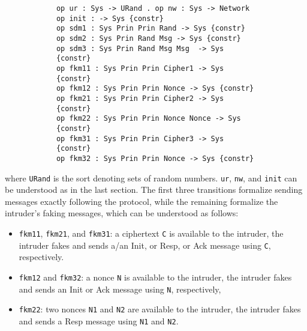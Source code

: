 \documentclass[10pt, conference, compsocconf]{IEEEtran}
\begin{document}
	\begin{small}
		\begin{verbatim}
			op ur : Sys -> URand . op nw : Sys -> Network
			op init : -> Sys {constr}
			op sdm1 : Sys Prin Prin Rand -> Sys {constr}
			op sdm2 : Sys Prin Rand Msg -> Sys {constr}
			op sdm3 : Sys Prin Rand Msg Msg  -> Sys 
			{constr}
			op fkm11 : Sys Prin Prin Cipher1 -> Sys 
			{constr}
			op fkm12 : Sys Prin Prin Nonce -> Sys {constr}
			op fkm21 : Sys Prin Prin Cipher2 -> Sys 
			{constr}
			op fkm22 : Sys Prin Prin Nonce Nonce -> Sys 
			{constr}
			op fkm31 : Sys Prin Prin Cipher3 -> Sys 
			{constr}
			op fkm32 : Sys Prin Prin Nonce -> Sys {constr}
		\end{verbatim}
	\end{small}
	
	
	\noindent
	where \verb!URand! is the sort denoting sets of random numbers.
	\verb!ur!, \verb!nw!, and \verb!init! can be understood as in the last section.
	The first three transitions formalize sending messages exactly following the protocol, while the remaining formalize the intruder's faking messages, which can be understood as follows:
	
	\begin{itemize}
		\item \verb!fkm11!, \verb!fkm21!, and \verb!fkm31!: a ciphertext \verb!C! is available to the intruder, the intruder fakes and sends a/an Init, or Resp, or Ack message using \verb!C!, respectively.
		\item \verb!fkm12! and \verb!fkm32!: a nonce \verb!N! is available to the intruder, the intruder fakes and sends an Init or Ack message using \verb!N!, respectively, 
		\item \verb!fkm22!: two nonces \verb!N1! and \verb!N2! are available to the intruder, the intruder fakes and sends a Resp message using \verb!N1! and \verb!N2!.
	\end{itemize}
	
	
	
\end{document}
